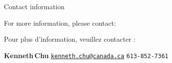 

\begin{frame}{\vskip -0.1cm \huge Contact information}

\large

\begin{center}
\begin{multicols}{2}
	\begin{minipage}{4.0cm}
	\vskip -2.5cm
	\begin{center}
	For more information,
	\vskip -0.01cm
	\noindent
	please contact:
	\end{center}
	\end{minipage}
\columnbreak
	\begin{minipage}{4.5cm}
	\vskip -2.6cm
	\begin{center}
	Pour plus d'information,
	\vskip -0.01cm
	\noindent
	veuillez contacter :
	\end{center}
	\end{minipage}
\end{multicols}
\end{center}

\begin{center}
\vskip 0.5cm
\textbf{\huge Kenneth\;\,Chu}
\vskip 0.15cm
\href{mailto:kenneth.chu@canada.ca}{\Large\color{darkBlue}\underline{\texttt{kenneth.chu@canada.ca}}}
\vskip 0.24cm
\texttt{\Large 613-852-7361}
\end{center}
%
\end{frame}

%
%
%
%
